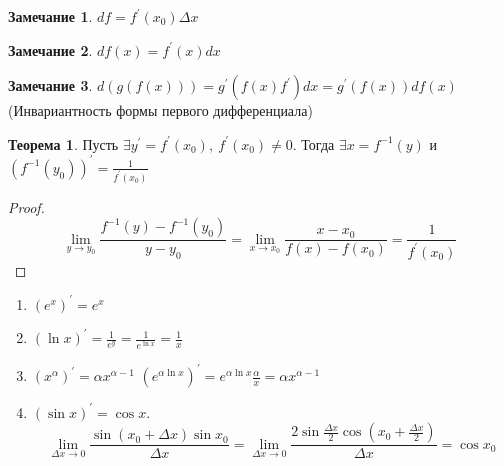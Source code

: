 \documentclass[a4paper, 12pt]{article}
\theoremstyle{definition}
\newtheorem*{theorem}{Теорема}
\newtheorem*{comm}{Замечание}
\begin{document}
        \begin{comm}
            $df=f^{\prime}(x_0)\Delta x$
        \end{comm} 
        \begin{comm}
            $df(x)=f^{\prime}(x)dx$
        \end{comm} 
        \begin{comm}
            $d(g(f(x)))=g^{\prime}(f(x)f^{\prime})dx=g^{\prime}(f(x))df(x)$ (Инвариантность формы первого дифференциала)
        \end{comm} 
        \begin{theorem}
            Пусть $\exists y^{\prime}=f^{\prime}(x_0),\ f^{\prime}(x_0)\ne 0$. Тогда $\exists x=f^{-1}(y)$ и $(f^{-1}(y_0))^{\prime}=\frac{1}{f^{\prime}(x_0)}$
        \end{theorem} 
        \begin{proof}
            \[\lim\limits_{y\to y_0}\frac{f^{-1}(y)-f^{-1}(y_0)}{y-y_0}=\lim\limits_{x\to x_0}\frac{x-x_0}{f(x)-f(x_0)}=\frac{1}{f^{\prime}(x_0)}\]
        \end{proof} 
        \begin{enumerate}
            \item $(e^x)^{\prime}=e^x$
            \item $(\ln{x})^{\prime}= \frac{1}{e^y}=\frac{1}{e^{\ln{x}}}=\frac{1}{x}$
            \item $(x^{\alpha})^{\prime}=\alpha x^{\alpha-1}$
            $(e^{\alpha\ln{x}})^{\prime}=e^{\alpha\ln{x}}\frac{\alpha}{x}=\alpha x^{\alpha-1}$
            \item $(\sin{x})^{\prime}=\cos{x}$.
            \[\lim\limits_{\Delta x\to 0}\frac{\sin{(x_0+\Delta x)\sin{x_0}}}{\Delta x}=\lim\limits_{\Delta x\to 0}\frac{2\sin{\frac{\Delta x}{2}}\cos{(x_0+\frac{\Delta x}{2})}}{\Delta x}=\cos{x_0}\]
        \end{enumerate}
        
\end{document}
